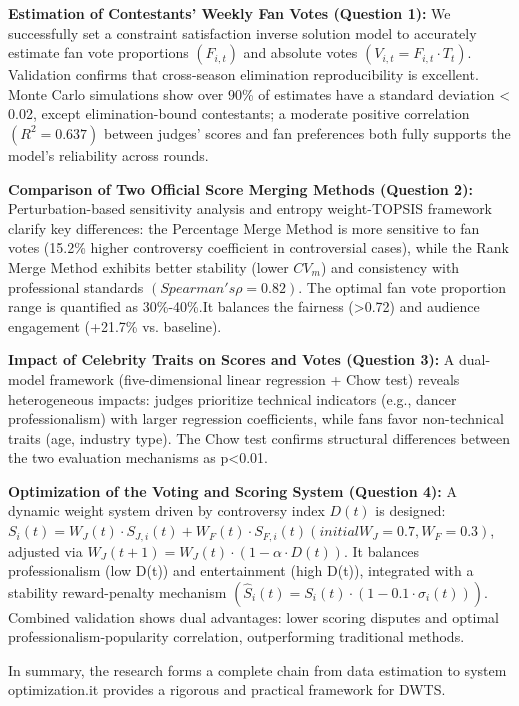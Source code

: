 \documentclass{mcmthesis}
\begin{document}
\noindent\textbf{Estimation of Contestants' Weekly Fan Votes (Question 1):}
We successfully set a constraint satisfaction inverse solution model to accurately estimate fan vote proportions $(F_{i,t})$ and absolute votes $(V_{i,t}=F_{i,t} \cdot T_t)$. Validation confirms that cross-season elimination reproducibility is excellent. Monte Carlo simulations show over 90\% of estimates have a standard deviation < 0.02, except elimination-bound contestants; a moderate positive correlation $(R^2=0.637)$ between judges' scores and fan preferences both fully supports the model's reliability across rounds.

\noindent\textbf{Comparison of Two Official Score Merging Methods (Question 2):}
Perturbation-based sensitivity analysis and entropy weight-TOPSIS framework clarify key differences: the Percentage Merge Method is more sensitive to fan votes (15.2\% higher controversy coefficient in controversial cases), while the Rank Merge Method exhibits better stability (lower $CV_m$) and consistency with professional standards $(Spearman's \rho=0.82)$. The optimal fan vote proportion range is quantified as 30\%-40\%.It balances the fairness (>0.72) and audience engagement (+21.7\% vs. baseline).

\noindent\textbf{Impact of Celebrity Traits on Scores and Votes (Question 3):}
A dual-model framework (five-dimensional linear regression + Chow test) reveals heterogeneous impacts: judges prioritize technical indicators (e.g., dancer professionalism) with larger regression coefficients, while fans favor non-technical traits (age, industry type). The Chow test confirms structural differences between the two evaluation mechanisms as p<0.01. 

\noindent\textbf{Optimization of the Voting and Scoring System (Question 4):}
A dynamic weight system driven by controversy index $D(t)$ is designed: $S_i(t)=W_J(t) \cdot S_{J,i}(t)+W_F(t) \cdot S_{F,i}(t) (initial W_J=0.7, W_F=0.3)$, adjusted via $W_{J}(t+1)=W_{J}(t) \cdot(1-\alpha \cdot D(t))$. It balances professionalism (low D(t)) and entertainment (high D(t)), integrated with a stability reward-penalty mechanism $(\hat{S}_i(t)=S_i(t) \cdot(1-0.1 \cdot \sigma_i(t)))$. Combined validation shows dual advantages: lower scoring disputes and optimal professionalism-popularity correlation, outperforming traditional methods.

In summary, the research forms a complete chain from data estimation to system optimization.it provides a rigorous and practical framework for DWTS.
\end{document}
